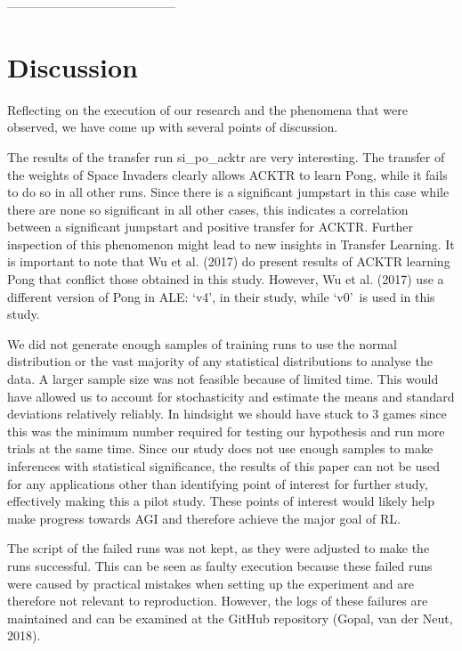 -----------------------------------------
\section{Discussion}
Reflecting on the execution of our research and the phenomena that were observed, we have come up with several points of discussion. 

The results of the transfer run si\_po\_acktr are very interesting. The transfer of the weights of Space Invaders clearly allows ACKTR to learn Pong, while it fails to do so in all other runs. Since there is a significant jumpstart in this case while there are none so significant in all other cases, this indicates a correlation between a significant jumpstart and positive transfer for ACKTR. Further inspection of this phenomenon might lead to new insights in Transfer Learning. It is important to note that Wu et al. (2017) do present results of ACKTR learning Pong that conflict those obtained in this study. However, Wu et al. (2017) use a different version of Pong in ALE: \lq v4\rq , in their study, while \lq v0\rq \ is used in this study. 

We did not generate enough samples of training runs to use the normal distribution or the vast majority of any statistical distributions to analyse the data. A larger sample size was not feasible because of limited time. This would have allowed us to account for stochasticity and estimate the means and standard deviations relatively reliably. In hindsight we should have stuck to 3 games since this was the minimum number required for testing our hypothesis and run more trials at the same time. Since our study does not use enough samples to make inferences with statistical significance, the results of this paper can not be used for any applications other than identifying point of interest for further study, effectively making this a pilot study. These points of interest would likely help make progress towards AGI and therefore achieve the major goal of RL.

The script of the failed runs was not kept, as they were adjusted to make the runs successful. This can be seen as faulty execution because these failed runs were caused by practical mistakes when setting up the experiment and are therefore not relevant to reproduction. However, the logs of these failures are maintained and can be examined at the GitHub repository (Gopal, van der Neut, 2018).

